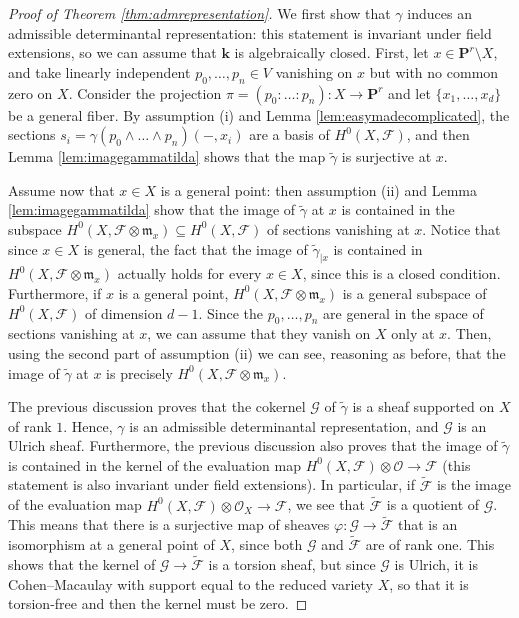 \documentclass[12pt]{amsart}
\numberwithin{equation}{section}
\numberwithin{thmcounter}{section}
\theoremstyle{definition}
\theoremstyle{claim}
\newcommand{\kk}{\mathbf{k}}
\newcommand{\nP}{\mathbf{P}}
\newcommand{\sF}{\mathscr{F}}
\newcommand{\sG}{\mathscr{G}}
\newcommand{\sO}{\mathscr{O}}
\begin{document}
\begin{proof}[Proof of Theorem \ref{thm:admrepresentation}]
	 We first show that $\gamma$ induces an admissible determinantal representation: this statement is invariant under field extensions, so we can assume that $\kk$ is algebraically closed. First, let $x\in \nP^r\setminus X$, and take linearly independent $p_0,\dots,p_n \in V$ vanishing on $x$ but with no common zero on $X$. Consider the projection $\pi = (p_0:\dots:p_n) \colon X\to \nP^r$ and let $\{x_1,\dots,x_d\}$ be a general fiber. By assumption (i) and Lemma \ref{lem:easymadecomplicated}, the sections $s_i = \gamma(p_0\wedge \dots \wedge p_n)(-,x_i)$ are a basis of $H^0(X,\sF)$, and then Lemma \ref{lem:imagegammatilda} shows that the map $\widetilde{\gamma}$ is surjective at $x$.
	\medskip

	\noindent
	Assume now that $x \in X$ is a general point: then assumption (ii) and Lemma \ref{lem:imagegammatilda} show that the image of $\widetilde{\gamma}$ at $x$ is contained in the subspace $H^0(X,\sF\otimes \mathfrak{m}_x) \subseteq H^0(X,\sF)$ of sections vanishing at $x$. Notice that since $x\in X$ is general, the fact that the image of $\widetilde{\gamma}_{|x}$ is contained in  $H^0(X,\sF\otimes \mathfrak{m}_x)$ actually holds for every $x\in X$, since this is a closed condition. Furthermore, if $x$ is a general point, $H^0(X,\sF\otimes \mathfrak{m}_x)$ is a general subspace of $H^0(X,\sF)$ of dimension $d-1$. Since the $p_0,\dots,p_n$ are general in the space of sections vanishing at $x$, we can assume that they vanish on $X$ only at $x$.  Then, using the second part of assumption (ii) we can see, reasoning as before, that the image of $\widetilde{\gamma}$ at $x$ is precisely $H^0(X,\sF\otimes \mathfrak{m}_x)$.
	\medskip

	\noindent
	The previous discussion proves that the cokernel $\sG$ of $\widetilde{\gamma}$ is a sheaf supported on $X$ of rank $1$. Hence, $\gamma$ is an admissible determinantal representation, and $\sG$ is an Ulrich sheaf. Furthermore, the previous discussion also proves that the image of $\widetilde{\gamma}$ is contained in the kernel of the  evaluation map $H^0(X,\sF)\otimes \sO \to \sF$ (this statement is also invariant under field extensions). In particular, if $\widetilde{\sF}$ is the image of the evaluation map $H^0(X,\sF)\otimes \sO_X \to \sF$, we see that  $\widetilde{\sF}$ is a quotient of $\sG$. This means that there is a surjective map of sheaves $\varphi\colon \sG \to \widetilde{\sF}$ that is an isomorphism at a general point of $X$, since both $\sG$ and $\widetilde{\sF}$ are of rank one. This shows that the kernel of $\sG \to \widetilde{\sF}$ is a torsion sheaf, but since $\sG$ is Ulrich, it is Cohen--Macaulay with support equal to the reduced variety $X$, so that it is torsion-free and then the kernel must be zero.
	\end{proof}
\end{document}
